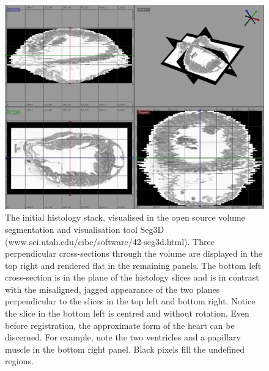       \begin{landscape}
        \begin{figure}[htbp]
          \centering
          \includegraphics[width=1\textwidth]{Ch6/Figs/Seg3D_histology}
          \caption{The initial histology stack, visualised in the open source volume segmentation and visualisation tool Seg3D (www.sci.utah.edu/cibc/software/42-seg3d.html). Three perpendicular cross-sections through the volume are displayed in the top right and rendered flat in the remaining panels. The bottom left cross-section is in the plane of the histology slices and is in contrast with the misaligned, jagged appearance of the two planes perpendicular to the slices in the top left and bottom right. Notice the slice in the bottom left is centred and without rotation. Even before registration, the approximate form of the heart can be discerned. For example, note the two ventricles and a papillary muscle in the bottom right panel. Black pixels fill the undefined regions.}
          \label{fig:Seg3D_histology}
        \end{figure}
      \end{landscape}
      
